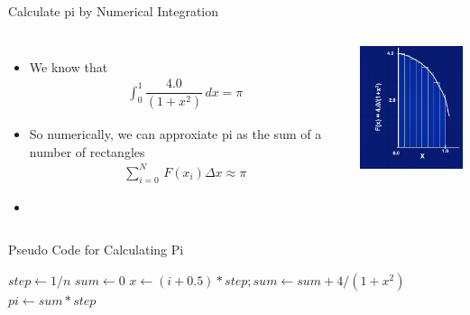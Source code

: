 \documentclass[10pt,t]{beamer}
\begin{document}
\begin{frame}[allowframebreaks]{Calculate pi by Numerical Integration}
  \begin{columns}
    \column{5cm}
    \begin{itemize}
      \item We know that
      \begin{align*}
        \int^1_0 \dfrac{4.0}{(1+x^2)}\, dx = \pi
      \end{align*}
      \item So numerically, we can approxiate pi as the sum of a number of rectangles
      \begin{align*}
        \sum^N_{i=0}\,F(x_i)\Delta x \approx \pi
      \end{align*}
      \item[] 
    \end{itemize}
    \column{5cm}
    \begin{center}
      \includegraphics[width=4cm]{./pi}
    \end{center}
  \end{columns}

  \begin{algorithm}[H]
    \caption{Pseudo Code for Calculating Pi}
    \begin{algorithmic}
        \State $step \gets 1/n$
        \State $sum \gets 0$
        \State $x \gets (i+0.5)*step; sum \gets sum + 4/(1+x^2)$
        \EndDo
        \State $pi \gets sum * step$
        \EndFunction
    \end{algorithmic}
  \end{algorithm}
\end{frame}
\end{document}
